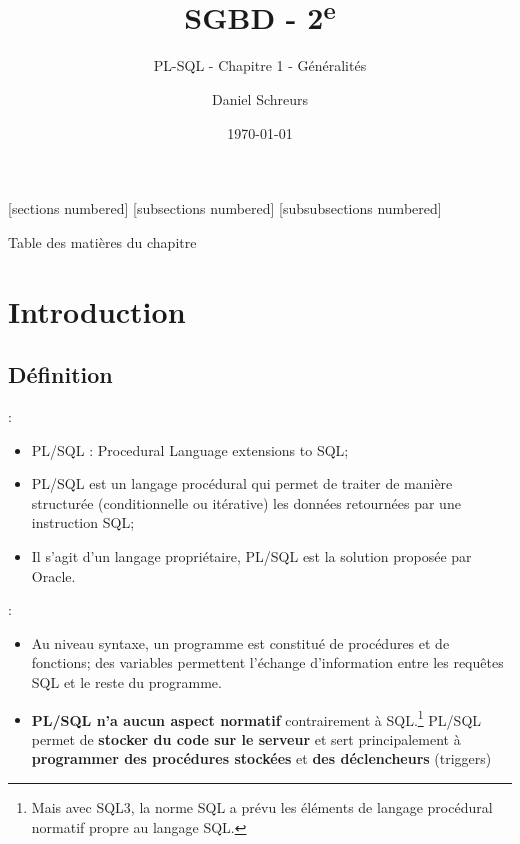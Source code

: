 \documentclass[10pt]{beamer}
\title{SGBD - 2\textsuperscript{e}}
\subtitle{PL-SQL - Chapitre 1 - Généralités}
\date{\today}
\author{Daniel Schreurs}
\institute{Haute École de Province de Liège}
\begin{document}
\maketitle

[sections numbered]
[subsections numbered]
[subsubsections numbered]
\begin{frame}[allowframebreaks]{Table des matières du chapitre}
    \tableofcontents[subsectionstyle=show/show/hide,subsubsectionstyle=show/show/hide,]
\end{frame}

\section{Introduction}
\tocss
\subsection{Définition}
\begin{frame}{\secname : \subsecname}
    \begin{itemize}
        \item PL/SQL : Procedural Language extensions to SQL;
        \item PL/SQL est un langage procédural qui permet de traiter de manière structurée (conditionnelle ou itérative) les données retournées par une instruction SQL;
        \item Il s'agit d'un langage propriétaire, PL/SQL est la solution proposée par Oracle.
    \end{itemize}
\end{frame}

\begin{frame}{\secname : \subsecname}
    \begin{itemize}
        \item Au niveau syntaxe, un programme est constitué de procédures et de fonctions; des variables permettent l'échange d'information entre les requêtes SQL et le reste du programme.
        \item \textbf{PL/SQL n'a aucun aspect normatif} contrairement à SQL.\footnote{Mais avec SQL3, la norme SQL a prévu les éléments de langage procédural normatif propre au langage SQL.}
              PL/SQL permet de \textbf{stocker du code sur le serveur} et sert principalement à \textbf{programmer des procédures stockées} et \textbf{des déclencheurs} (triggers)
    \end{itemize}
\end{frame}
\end{document}
